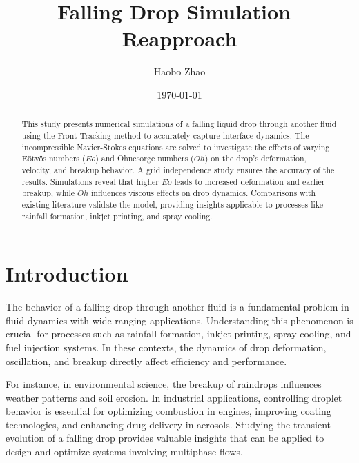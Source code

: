 \documentclass[12pt]{article}
\title{Falling Drop Simulation--Reapproach}
\author{Haobo Zhao}
\date{\today}
\begin{document}
\maketitle


\begin{abstract}
This study presents numerical simulations of a falling liquid drop through another fluid using the Front Tracking method to accurately capture interface dynamics. The incompressible Navier-Stokes equations are solved to investigate the effects of varying Eötvös numbers ($Eo$) and Ohnesorge numbers ($Oh$) on the drop's deformation, velocity, and breakup behavior. A grid independence study ensures the accuracy of the results. Simulations reveal that higher $Eo$ leads to increased deformation and earlier breakup, while $Oh$ influences viscous effects on drop dynamics. Comparisons with existing literature validate the model, providing insights applicable to processes like rainfall formation, inkjet printing, and spray cooling.
\end{abstract}



\section{Introduction}

The behavior of a falling drop through another fluid is a fundamental problem in fluid dynamics with wide-ranging applications. Understanding this phenomenon is crucial for processes such as rainfall formation, inkjet printing, spray cooling, and fuel injection systems. In these contexts, the dynamics of drop deformation, oscillation, and breakup directly affect efficiency and performance.

For instance, in environmental science, the breakup of raindrops influences weather patterns and soil erosion. In industrial applications, controlling droplet behavior is essential for optimizing combustion in engines, improving coating technologies, and enhancing drug delivery in aerosols. Studying the transient evolution of a falling drop provides valuable insights that can be applied to design and optimize systems involving multiphase flows.
\end{document}
